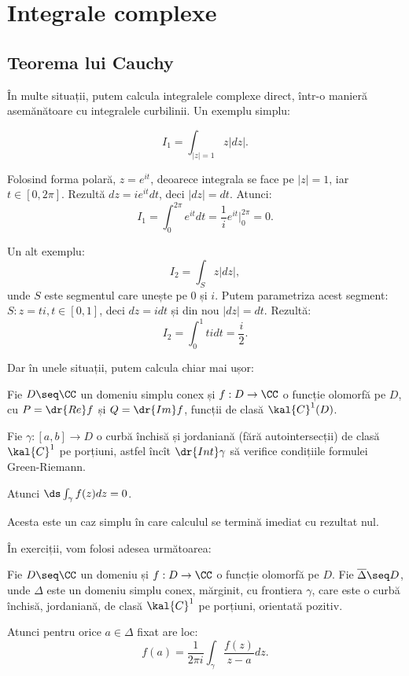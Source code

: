 
\chapter{Integrale complexe}

\section{Teorema lui Cauchy}
\indent\indent În multe situații, putem calcula integralele complexe direct,
într-o manieră asemănătoare cu integralele curbilinii. Un exemplu simplu:

\[
  I_1 = \int_{|z| = 1} z |dz|.
\]

Folosind forma polară, $ z = e^{it} $, deoarece integrala se face pe
$ |z| = 1 $, iar $ t \in [0, 2\pi] $. Rezultă $ dz = ie^{it} dt $,
deci $ |dz| = dt $. Atunci:
\[
  I_1 = \int_0^{2\pi} e^{it} dt = \dfrac{1}{i} e^{it} \Big|_0^{2\pi} = 0.
\]

Un alt exemplu:
\[
  I_2 = \int_S z |dz|,
\]
unde $ S $ este segmentul care unește pe $ 0 $ și $ i $. Putem parametriza
acest segment: $S : z = ti, t \in [0,1] $, deci $ dz = idt $ și din nou
$ |dz| = dt $. Rezultă:
\[
  I_2 = \int_0^1 tidt = \dfrac{i}{2}.
\]

Dar în unele situații, putem calcula chiar mai ușor:
\begin{theorem}[Cauchy]\label{thm:tcauchy} 
  Fie $ D \seq \CC $ un domeniu simplu conex și $ f : D \to \CC $ o funcție
  olomorfă pe $ D $, cu $ P = \dr{Re}f $ și $ Q = \dr{Im} f $, funcții de clasă
  $ \kal{C}^1(D) $.

  Fie $ \gamma : [a, b] \to D $ o curbă închisă și jordaniană (fără autointersecții)
  de clasă $ \kal{C}^1 $ pe porțiuni, astfel încît $ \dr{Int}\gamma $ să verifice
  condițiile formulei Green-Riemann.

  Atunci $ \ds\int_\gamma f(z) dz = 0 $.
\end{theorem}

Acesta este un caz simplu în care calculul se termină imediat cu rezultat nul.

În exerciții, vom folosi adesea următoarea:
\begin{theorem}\label{thm:fintcauchy}
  Fie $ D \seq \CC $ un domeniu și $ f : D \to \CC $ o funcție olomorfă pe $ D $.
  Fie $ \overline{\Delta} \seq D $, unde $ \Delta $ este un domeniu simplu conex,
  mărginit, cu frontiera $ \gamma $, care este o curbă închisă, jordaniană, de
  clasă $ \kal{C}^1 $ pe porțiuni, orientată pozitiv.

  Atunci pentru orice $ a \in \Delta $ fixat are loc:
  \[
    f(a) = \dfrac{1}{2 \pi i} \int_\gamma \dfrac{f(z)}{z - a} dz.
  \]
\end{theorem}

